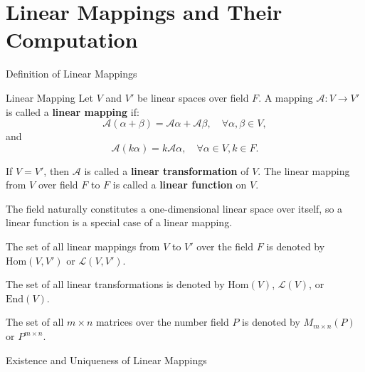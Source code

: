 \documentclass[11pt]{../../TexTemplate/elegantbook} %
\begin{document}
\section{Linear Mappings and Their Computation}
\begin{leftbarTitle}{Definition of Linear Mappings}\end{leftbarTitle}
\begin{definition}{Linear Mapping}
    Let \( V \) and \( V' \) be linear spaces over field \( F \).
    A mapping \( \mathcal{A}: V \to V' \) is called a \textbf{linear mapping} if:
    \[
    \mathcal{A}(\alpha + \beta) = \mathcal{A}\alpha + \mathcal{A}\beta, \quad \forall \alpha, \beta \in V,
    \]
    and
    \[
    \mathcal{A}(k\alpha) = k\mathcal{A}\alpha, \quad \forall \alpha \in V, k \in F.
    \]

    If \( V = V' \), then \( \mathcal{A} \) is called a \textbf{linear transformation} of \( V \).
    The linear mapping from \( V \) over field \( F \) to \(F\) is called a \textbf{linear function} on \( V \).
\end{definition}

\begin{remark}
    The field naturally constitutes a one-dimensional linear space over itself, 
    so a linear function is a special case of a linear mapping.
\end{remark}


\begin{remark}
    The set of all linear mappings from $V$ to $V'$ over the field $F$ is denoted by $\mathrm{Hom}(V,V')$ or $\mathcal{L}(V,V')$.

    The set of all linear transformations is denoted by $\mathrm{Hom}(V)$, $\mathcal{L}(V)$, or $\mathrm{End}(V)$.

    The set of all $m \times n$ matrices over the number field $P$ is denoted by \(M_{m \times n}(P)\) or \(P^{m\times n}\).
\end{remark}


\begin{leftbarTitle}{Existence and Uniqueness of Linear Mappings}\end{leftbarTitle}
\end{document}
